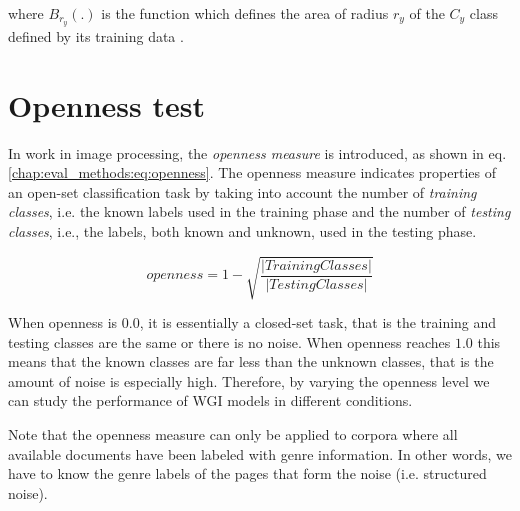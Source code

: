\noindent
where $B_{r_{y}}(.)$ is the function which defines the area of radius $r_{y}$ of the $C_{y}$ class defined by its training data \parencite{fei2016breaking}.

\section{Openness test}\label{chap:eval_methods:sec:openness}

In \parencite{scheirer2013toward} work in image processing, the \textit{openness measure} is introduced, as shown in eq. \ref{chap:eval_methods:eq:openness}. The openness measure indicates properties of an open-set classification task by taking into account the number of \textit{training classes}, i.e. the known labels used in the training phase and the number of \textit{testing classes}, i.e., the labels, both known and unknown, used in the testing phase.

\begin{equation}\label{chap:eval_methods:eq:openness}
	openness=1-\sqrt{\frac{ | Training Classes | }{ |Testing Classes | }}
\end{equation}

When openness is $0.0$, it is essentially a closed-set task, that is the training and testing classes are the same or there is no noise. When openness reaches $1.0$ this means that the known classes are far less than the unknown classes, that is the amount of noise is especially high. Therefore, by varying the openness level we can study the performance of WGI models in different conditions.

Note that the openness measure can only be applied to corpora where all available documents have been labeled with genre information. In other words, we have to know the genre labels of the pages that form the noise (i.e. structured noise).

